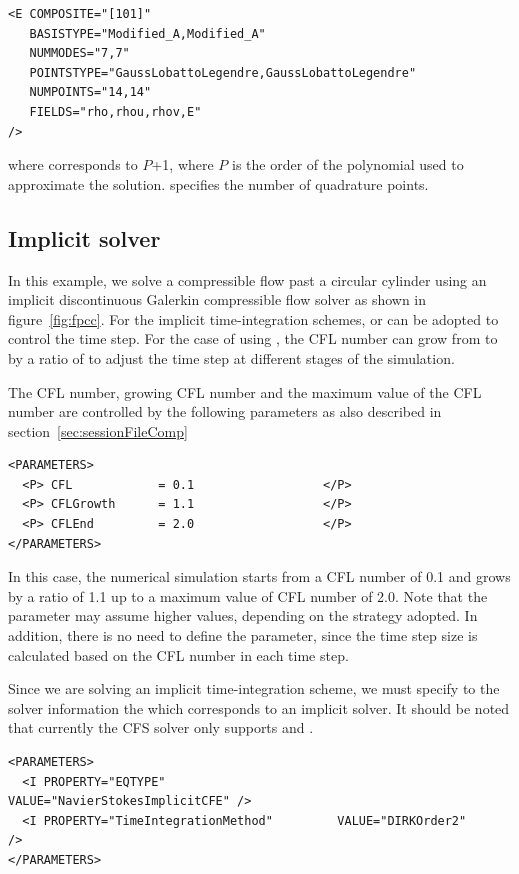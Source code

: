 \begin{lstlisting}[style=XmlStyle]
<E COMPOSITE="[101]"
   BASISTYPE="Modified_A,Modified_A"
   NUMMODES="7,7"
   POINTSTYPE="GaussLobattoLegendre,GaussLobattoLegendre"
   NUMPOINTS="14,14"
   FIELDS="rho,rhou,rhov,E"
/>
\end{lstlisting}

where  corresponds to $P$+1, where $P$ is the order of the polynomial
used to approximate the solution.  specifies the number of quadrature
points.


\subsection{Implicit solver}
In this example, we solve a compressible flow past a circular cylinder using an 
implicit discontinuous Galerkin compressible flow solver as shown in figure~\ref{fig:fpcc}. 
For the implicit time-integration schemes,  or  
can be adopted to control the time step. For the case of using , the CFL number 
can grow from  to  by a ratio of  to adjust 
the time step at different stages of the simulation. 

The CFL number, growing CFL number and the maximum value of the CFL number 
are controlled by the following parameters as also described in section~\ref{sec:sessionFileComp}
\begin{lstlisting}[style=XmlStyle]
<PARAMETERS>
  <P> CFL            = 0.1                  </P>
  <P> CFLGrowth      = 1.1                  </P>
  <P> CFLEnd         = 2.0                  </P>
</PARAMETERS>
\end{lstlisting}
In this case, the numerical simulation starts from a CFL number of 0.1 and grows 
by a ratio of 1.1 up to a maximum value of CFL number of 2.0. Note that the 
 parameter may assume higher values, depending on the strategy 
adopted. In addition, there is no need to define the  parameter, 
since the time step size is calculated based on the CFL number in each time step.

Since we are solving an implicit time-integration scheme, we must specify to 
the solver information the  which corresponds to an implicit solver. 
It should be noted that currently the CFS solver only supports 
 and .
\begin{lstlisting}[style=XmlStyle]
<PARAMETERS>
  <I PROPERTY="EQTYPE"                        VALUE="NavierStokesImplicitCFE" />
  <I PROPERTY="TimeIntegrationMethod"         VALUE="DIRKOrder2"              />
</PARAMETERS>
\end{lstlisting}

